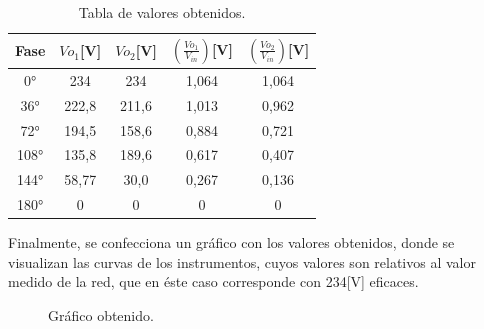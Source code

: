 \begin{table}[H]
\centering
  \begin{tabular}{|c|c|c|c|c|}
    \hline
      Fase & $Vo_1$[V] & $Vo_2$[V] & $(\frac{Vo_1}{V_{in}})$[V] & $(\frac{Vo_2}{V_{in}})$[V] \\
    \hline
      0°    & 234     & 234     & 1,064   & 1,064\\
      36°   & 222,8   & 211,6   & 1,013   & 0,962\\
      72°   & 194,5   & 158,6   & 0,884   & 0,721\\
      108°  & 135,8   & 189,6   & 0,617   & 0,407\\
      144°  & 58,77   & 30,0    & 0,267   & 0,136\\
      180°  & 0       & 0       & 0       & 0\\
    \hline
  \end{tabular}
\caption{Tabla de valores obtenidos.}
\label{tab:TablaExp2}
\end{table}

Finalmente, se confecciona un gráfico con los valores obtenidos, 
donde se visualizan las curvas de los instrumentos, cuyos valores 
son relativos al valor medido de la red, que en éste caso corresponde 
con 234[V] eficaces.

\begin{figure}[H]
  \centering
  \caption{Gráfico obtenido.}
  \label{fig:CurvaTrueMedio}
\end{figure}
